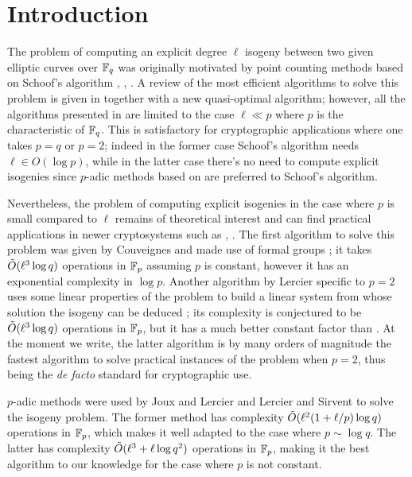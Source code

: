 \section{Introduction}

The problem of computing an explicit degree $\ell$ isogeny between two
given elliptic curves over $\mathbb{F}_q$ was originally motivated by point
counting methods based on Schoof's algorithm \cite{Atk91},
\cite{Elk91}, \cite{Sch95}. A review of the most efficient algorithms
to solve this problem is given in \cite{BoMoSaSc08} together with a
new quasi-optimal algorithm; however, all the algorithms presented in
\cite{BoMoSaSc08} are limited to the case $\ell\ll p$ where $p$ is the
characteristic of $\mathbb{F}_q$. This is satisfactory for cryptographic
applications where one takes $p=q$ or $p=2$; indeed in the former case
Schoof's algorithm needs $\ell\in O(\log p)$, while in the latter case
there's no need to compute explicit isogenies since $p$-adic methods
based on \cite{Sat00} are preferred to Schoof's algorithm.

Nevertheless, the problem of computing explicit isogenies in the case
where $p$ is small compared to $\ell$ remains of theoretical interest
and can find practical applications in newer cryptosystems such as
\cite{Tes06}, \cite{RoSt06}. The first algorithm to solve this problem
was given by Couveignes and made use of formal groups \cite{Cou94}; it
takes $\tilde{O}(\ell^3\log q)$ operations in $\mathbb{F}_p$ assuming $p$ is
constant, however it has an exponential complexity in $\log
p$. Another algorithm by Lercier specific to $p=2$ uses some linear
properties of the problem to build a linear system from whose solution
the isogeny can be deduced \cite{Ler96}; its complexity is conjectured
to be $\tilde{O}(\ell^3\log q)$ operations in $\mathbb{F}_p$, but it has a much
better constant factor than \cite{Cou94}. At the moment we write, the
latter algorithm is by many orders of magnitude the fastest algorithm
to solve practical instances of the problem when $p=2$, thus being the
\emph{de facto} standard for cryptographic use.

$p$-adic methods were used by Joux and Lercier \cite{JL06} and Lercier
and Sirvent \cite{LeSi09} to solve the isogeny problem. The former
method has complexity $\tilde{O}(\ell^2(1 + \ell/p)\log q)$ operations in
$\mathbb{F}_p$, which makes it well adapted to the case where $p\sim\log
q$. The latter has complexity $\tilde{O}(\ell^3 + \ell\log q^2)$
operations in $\mathbb{F}_p$, making it the best algorithm to our knowledge
for the case where $p$ is not constant.

